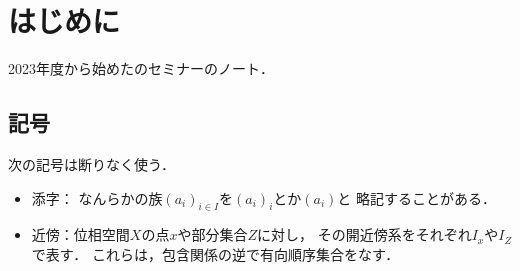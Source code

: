 \theoremstyle{mystyle}
\newtheorem{AXM}{公理}[section]
\newtheorem{DFN}[Axiom]{定義}
\newtheorem{THM}[Axiom]{定理}
\newtheorem*{THM*}{定理}
\newtheorem{STT}{主張}[chapter]
\newtheorem*{STT*}{主張}
\newtheorem{PRP}[Axiom]{命題}
\newtheorem{LMM}[Axiom]{補題}
\newtheorem*{LMM*}{補題}
\newtheorem{CRL}[Axiom]{系}
\newtheorem{EG}[Axiom]{例}
\newtheorem{CNV}[Axiom]{規約}
\newtheorem{NTT}[Axiom]{記法}
\newtheorem{RMK}[Axiom]{注意}
\newtheorem{CMT}{コメント}[chapter]
\newtheorem*{CMT*}{コメント}
\newtheorem{EXC}{演習}[chapter]




\def\inner<#1>{\langle #1 \rangle}









\maketitle
\layout
\chapter*{はじめに}
2023年度から始めた\cite{KS90}のセミナーのノート．

\section*{記号}
次の記号は断りなく使う．
\begin{itemize}
    \item 添字：
    なんらかの族$(a_i)_{i\in I}$を$(a_i)_i$とか$(a_i)$と
    略記することがある．
    \item 近傍：位相空間\(X\)の点\(x\)や部分集合\(Z\)に対し，
    その開近傍系をそれぞれ\(I_x\)や\(I_Z\)で表す．
    これらは，包含関係の逆で有向順序集合をなす．
\end{itemize}
\tableofcontents
